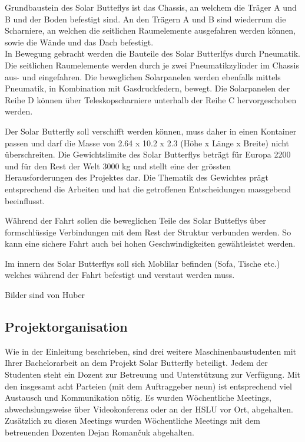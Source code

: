 Grundbaustein des Solar Butteflys ist das Chassis, an welchem die Träger A und B und der Boden befestigt sind. An den Trägern A und B sind wiederrum die Scharniere, an welchen die seitlichen Raumelemente ausgefahren werden können, sowie die Wände und das Dach befestigt.\\
In Bewegung gebracht werden die Bauteile des Solar Butterlfys durch Pneumatik. Die seitlichen Raumelemente werden durch je zwei Pneumatikzylinder im Chassis aus- und eingefahren. Die beweglichen Solarpanelen werden ebenfalls mittels Pneumatik, in Kombination mit Gasdruckfedern, bewegt. Die Solarpanelen der Reihe D können über Teleskopscharniere unterhalb der Reihe C hervorgeschoben werden.

Der Solar Butterfly soll verschifft werden können, muss daher in einen Kontainer passen und darf die Masse von 2.64 x 10.2 x 2.3 (Höhe x Länge x Breite) nicht überschreiten. Die Gewichtslimite des Solar Butterflys beträgt für Europa 2200 und für den Rest der Welt 3000 kg und stellt eine der grössten Herausforderungen des Projektes dar. Die Thematik des Gewichtes prägt entsprechend die Arbeiten und hat die getroffenen Entscheidungen massgebend beeinflusst.

Während der Fahrt sollen die beweglichen Teile des Solar Butteflys über formschlüssige Verbindungen mit dem Rest der Struktur verbunden werden. So kann eine sichere Fahrt auch bei hohen Geschwindigkeiten gewähtleistet werden.

Im innern des Solar Butterflys soll sich Moblilar befinden (Sofa, Tische etc.) welches während der Fahrt befestigt und verstaut werden muss.

Bilder sind von Huber
\subsection{Projektorganisation}
Wie in der Einleitung beschrieben, sind drei weitere Maschinenbaustudenten mit Ihrer Bachelorarbeit an dem Projekt Solar Butterfly beteiligt. Jedem der Studenten steht ein Dozent zur Betreuung und Unterstützung zur Verfügung. Mit den insgesamt acht Parteien (mit dem Auftraggeber neun) ist entsprechend viel Austausch und Kommunikation nötig. Es wurden Wöchentliche Meetings, abwechslungsweise über Videokonferenz oder an der HSLU vor Ort, abgehalten. Zusätzlich zu diesen Meetings wurden Wöchentliche Meetings mit dem betreuenden Dozenten Dejan Roman\v{c}uk abgehalten.
\newpage
